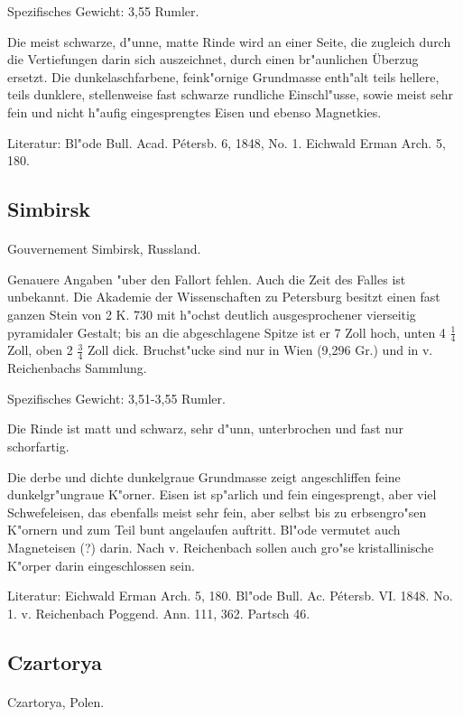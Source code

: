 \documentclass[a4paper, 11pt, oneside]{article}
\begin{document}
Spezifisches Gewicht: 3,55 Rumler.

Die meist schwarze, d"unne, matte Rinde wird an einer Seite, die zugleich durch die Vertiefungen darin sich auszeichnet, durch einen br"aunlichen Überzug ersetzt. Die dunkelaschfarbene, feink"ornige Grundmasse enth"alt teils hellere, teils dunklere, stellenweise fast schwarze rundliche Einschl"usse, sowie meist sehr fein und nicht h"aufig eingesprengtes Eisen und ebenso Magnetkies.

\footnotesize
Literatur: Bl"ode Bull. Acad. Pétersb. 6, 1848, No. 1. Eichwald Erman Arch. 5, 180.

\subsection{Simbirsk}
\normalsize
\paragraph{}
Gouvernement Simbirsk, Russland.

Genauere Angaben "uber den Fallort fehlen. Auch die Zeit des Falles ist unbekannt. Die Akademie der Wissenschaften zu Petersburg besitzt einen fast ganzen Stein von 2 K. 730 mit h"ochst deutlich ausgesprochener vierseitig pyramidaler Gestalt; bis an die abgeschlagene Spitze ist er 7 Zoll hoch, unten 4 $\frac{1}{4}$ Zoll, oben 2 $\frac{3}{4}$ Zoll dick. Bruchst"ucke sind nur in Wien (9,296 Gr.) und in v. Reichenbachs Sammlung.

Spezifisches Gewicht: 3,51-3,55 Rumler.

Die Rinde ist matt und schwarz, sehr d"unn, unterbrochen und fast nur schorfartig.

Die derbe und dichte dunkelgraue Grundmasse zeigt angeschliffen feine dunkelgr"ungraue K"orner. Eisen ist sp"arlich und fein eingesprengt, aber viel Schwefeleisen, das ebenfalls meist sehr fein, aber selbst bis zu erbsengro"sen K"ornern und zum Teil bunt angelaufen auftritt. Bl"ode vermutet auch Magneteisen (?) darin. Nach v. Reichenbach sollen auch gro"se kristallinische K"orper darin eingeschlossen sein.

\footnotesize
Literatur: Eichwald Erman Arch. 5, 180. Bl"ode Bull. Ac. Pétersb. VI. 1848. No. 1. v. Reichenbach Poggend. Ann. 111, 362. Partsch 46.

\subsection{Czartorya}
\normalsize
\paragraph{}
Czartorya, Polen.
\end{document}
